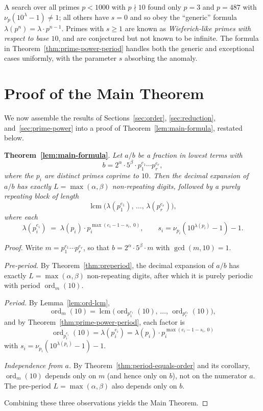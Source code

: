 \documentclass[12pt]{amsart}
\theoremstyle{definition}
\theoremstyle{remark}
\newcommand{\ord}{\operatorname{ord}}
\newcommand{\lcm}{\operatorname{lcm}}
\begin{document}
A search over all primes $p < 1000$ with $p \nmid 10$ found only 
$p = 3$ and $p = 487$ with $\nu_p(10^\lambda - 1) \ne 1$; all others 
have $s = 0$ and so obey the ``generic'' formula $\lambda(p^n) = 
\lambda \cdot p^{n-1}$. Primes with $s \ge 1$ are known as 
\emph{Wieferich-like primes with respect to base $10$}, and are 
conjectured but not known to be infinite. The formula in 
Theorem~\ref{thm:prime-power-period} handles both the generic and 
exceptional cases uniformly, with the parameter $s$ absorbing the 
anomaly.


\section{Proof of the Main Theorem}\label{sec:main-proof}

We now assemble the results of Sections~\ref{sec:order}, 
\ref{sec:reduction}, and~\ref{sec:prime-power} into a proof of Theorem~\ref{lem:main-formula}, restated below.

\textbf{Theorem~\ref{lem:main-formula}}. \textit{
Let $a/b$ be a fraction in lowest terms with
\[
  b = 2^\alpha \cdot 5^\beta \cdot p_1^{e_1} \cdots p_r^{e_r},
\]
where the $p_i$ are distinct primes coprime to $10$. Then the decimal
expansion of $a/b$ has exactly $L = \max(\alpha, \beta)$ non-repeating
digits, followed by a purely repeating block of length
\[
  \lcm\!\bigl(\lambda(p_1^{e_1}),\, \ldots,\, \lambda(p_r^{e_r})\bigr),
\]
where each
\[
  \lambda(p_i^{e_i}) \;=\; \lambda(p_i)\cdot p_i^{\max(e_i - 1 - s_i,\; 0)},
  \qquad s_i = \nu_{p_i}(10^{\lambda(p_i)} - 1) - 1.
\]}

\begin{proof}
Write $m = p_1^{e_1} \cdots p_r^{e_r}$, so that $b = 2^\alpha \cdot 
5^\beta \cdot m$ with $\gcd(m, 10) = 1$.

\smallskip

\emph{Pre-period.} By Theorem~\ref{thm:preperiod}, the decimal 
expansion of $a/b$ has exactly $L = \max(\alpha, \beta)$ non-repeating 
digits, after which it is purely periodic with period $\ord_m(10)$.

\smallskip

\emph{Period.} By Lemma~\ref{lem:ord-lcm},
\[
  \ord_m(10) = \lcm\!\bigl(\ord_{p_1^{e_1}}(10),\, \ldots,\, 
  \ord_{p_r^{e_r}}(10)\bigr),
\]
and by Theorem~\ref{thm:prime-power-period}, each factor is
\[
  \ord_{p_i^{e_i}}(10) = \lambda(p_i^{e_i}) = \lambda(p_i) \cdot 
  p_i^{\max(e_i - 1 - s_i,\, 0)}
\]
with $s_i = \nu_{p_i}(10^{\lambda(p_i)} - 1) - 1$.

\smallskip

\emph{Independence from $a$.} By Theorem~\ref{thm:period-equals-order} 
and its corollary, $\ord_m(10)$ depends only on $m$ (and hence only on 
$b$), not on the numerator $a$. The pre-period $L = \max(\alpha, \beta)$ 
also depends only on $b$.

\smallskip

Combining these three observations yields the Main Theorem.
\end{proof}
\end{document}

